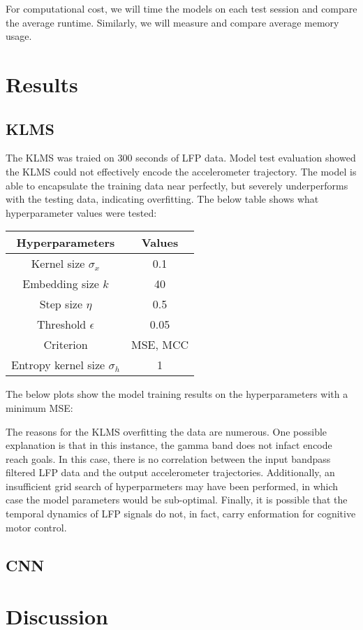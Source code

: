 \documentclass[12pt]{article}
\begin{document}
For computational cost, we will time the models on each test session and compare the average runtime. Similarly, we will measure and compare average memory usage.


\section{Results}

\subsection{KLMS}

The KLMS was traied on 300 seconds of LFP data. Model test evaluation showed the KLMS could not effectively encode the accelerometer trajectory. The model is able to encapsulate the training data near perfectly, but severely underperforms with the testing data, indicating overfitting. The below table shows what hyperparameter values were tested:

\begin{center}
\begin{tabular}{ |c|c| } 
\hline
Hyperparameters & Values\\ 
\hline
Kernel size $\sigma_x$ & 0.1 \\ 
Embedding size $k$ & 40\\
Step size $\eta$ & 0.5\\
Threshold $\epsilon$ & 0.05\\
Criterion & MSE, MCC\\
Entropy kernel size $\sigma_h$ & 1\\
\hline
\end{tabular}
\end{center}

The below plots show the model training results on the hyperparameters with a minimum MSE:

The reasons for the KLMS overfitting the data are numerous. One possible explanation is that in this instance, the gamma band does not infact encode reach goals. In this case, there is no correlation between the input bandpass filtered LFP data and the output accelerometer trajectories. Additionally, an insufficient grid search of hyperparmeters may have been performed, in which case the model parameters would be sub-optimal. Finally, it is possible that the temporal dynamics of LFP signals do not, in fact, carry enformation for cognitive motor control.

\subsection{CNN}


\section{Discussion}




\end{document}
